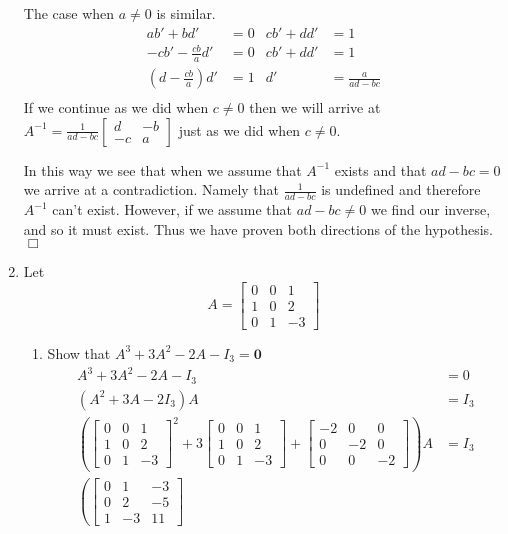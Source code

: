 \documentclass[letterpaper]{article}
\begin{document}
\begin{enumerate}
The case when $a\ne 0$ is similar.
\begin{align*}
  ab'+bd'&=0&cb'+dd'&=1\\
  -cb'-\frac{cb}{a}d'&=0&cb'+dd'&=1\\
  \left(d-\frac{cb}{a}\right)d'&=1&d'&=\frac{a}{ad-bc}\\
\end{align*}
If we continue as we did when $c\ne 0$ then we will arrive at $A^{-1}=\frac{1}{ad-bc}\left[\begin{array}{cc}d&-b\\-c&a\end{array}\right]$ just as we did when $c\ne 0$.

In this way we see that when we assume that $A^{-1}$ exists and that $ad-bc=0$ we arrive at a contradiction. Namely that $\frac{1}{ad-bc}$ is undefined and therefore $A^{-1}$ can't exist. However, if we assume that $ad-bc\ne 0$ we find our inverse, and so it must exist. Thus we have proven both directions of the hypothesis.
$\Box$
\item
Let
\[A=\left[\begin{array}{ccc}0&0&1\\1&0&2\\0&1&-3\end{array}\right]\]
  \begin{enumerate}
  \item
  Show that $A^3+3A^2-2A-I_3=\mathbf{0}$
  \begin{align*}
    A^3+3A^2-2A-I_3&=0\\
    (A^2+3A-2I_3)A&=I_3\\
    \left( \left[\begin{array}{ccc}0&0&1\\1&0&2\\0&1&-3\end{array}\right]^2
    +3\left[\begin{array}{ccc}0&0&1\\1&0&2\\0&1&-3\end{array}\right]
    +\left[\begin{array}{ccc}-2&0&0\\0&-2&0\\0&0&-2\end{array}\right]
    \right)A&=I_3\\
    \left( \left[\begin{array}{ccc}0&1&-3\\0&2&-5\\1&-3&11\end{array}\right]

\end{align*}
\end{enumerate}
\end{enumerate}
\end{document}
